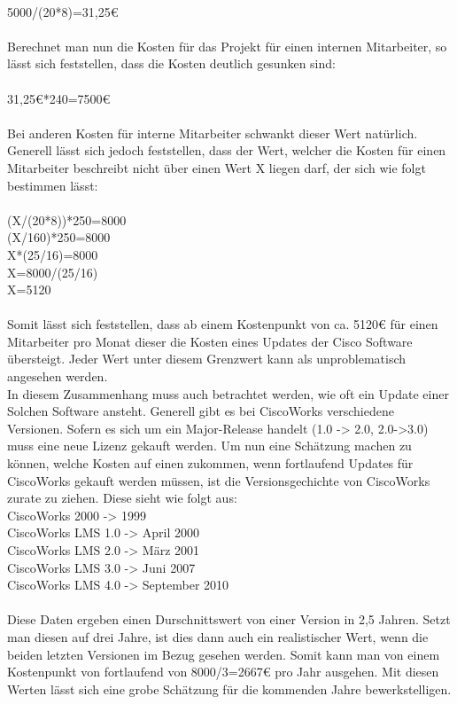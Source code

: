 \\
5000/(20*8)=31,25€\\
\\
Berechnet man nun die Kosten für das Projekt für einen internen Mitarbeiter, so lässt sich feststellen, dass die Kosten deutlich gesunken sind:\\
\\
31,25€*240=7500€\\
\\
Bei anderen Kosten für interne Mitarbeiter schwankt dieser Wert natürlich. Generell lässt sich jedoch feststellen, dass der Wert, welcher die Kosten für einen Mitarbeiter beschreibt nicht über einen Wert X liegen darf, der sich wie folgt bestimmen lässt:\\
\\
(X/(20*8))*250=8000\\
(X/160)*250=8000\\
X*(25/16)=8000\\
X=8000/(25/16)\\
X=5120\\
\\
Somit lässt sich feststellen, dass ab einem Kostenpunkt von ca. 5120€ für einen Mitarbeiter pro Monat dieser die Kosten eines Updates der Cisco Software übersteigt. Jeder Wert unter diesem Grenzwert kann als unproblematisch angesehen werden.\\
In diesem Zusammenhang muss auch betrachtet werden, wie oft ein Update einer Solchen Software ansteht. Generell gibt es bei CiscoWorks verschiedene Versionen. Sofern es sich um ein Major-Release handelt (1.0 -> 2.0, 2.0->3.0) muss eine neue Lizenz gekauft werden. Um nun eine Schätzung machen zu können, welche Kosten auf einen zukommen, wenn fortlaufend Updates für CiscoWorks gekauft werden müssen, ist die Versionsgechichte von CiscoWorks zurate zu ziehen. Diese sieht wie folgt aus:
\\
CiscoWorks 2000 -> 1999\\
CiscoWorks LMS 1.0 -> April 2000\\
CiscoWorks LMS 2.0 -> März 2001 \\
CiscoWorks LMS 3.0 -> Juni 2007\\
CiscoWorks LMS 4.0 -> September 2010\\
\\
Diese Daten ergeben einen Durschnittswert von einer Version in 2,5 Jahren. Setzt man diesen auf drei Jahre, ist dies dann auch ein realistischer Wert, wenn die beiden letzten Versionen im Bezug gesehen werden. Somit kann man von einem Kostenpunkt von fortlaufend von 8000/3=2667€ pro Jahr ausgehen. Mit diesen Werten lässt sich eine grobe Schätzung für die kommenden Jahre bewerkstelligen.

